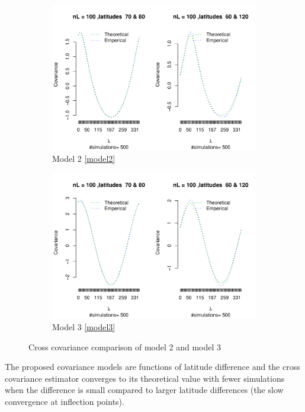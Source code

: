 \begin{figure}
	\begin{subfigure}{1\textwidth}
		\centering
		\includegraphics[keepaspectratio, scale=0.8]{graphs/Model2}
		\caption{Model 2 \eqref{model2}}
		\label{fig:cov2}
	\end{subfigure}
	\begin{subfigure}{1\textwidth}
		\centering
		\includegraphics[keepaspectratio, scale=0.8]{graphs/Model3}
		\caption{Model 3 \eqref{model3}}
		\label{fig:cov3}
	\end{subfigure}
\caption{Cross covariance comparison of model 2 and model 3}
\end{figure}


The proposed covariance models are functions of latitude difference and the cross covariance estimator converges to its theoretical value with fewer simulations when the difference is small compared to larger latitude differences (the slow convergence at inflection points).     

